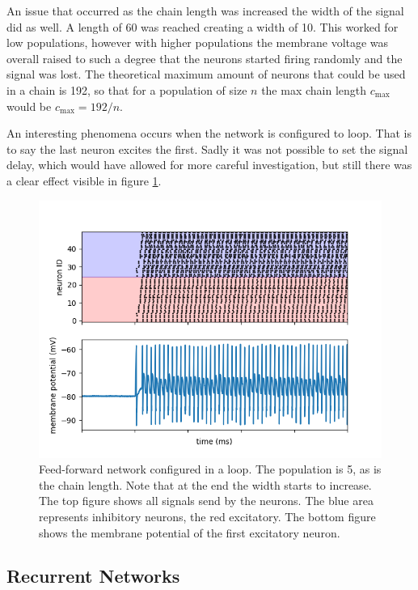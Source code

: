 \documentclass[a4paper,twocolumn]{article}
\begin{document}
An issue that occurred as the chain length was increased the width of the signal
did as well. A length of 60 was reached creating a width of 10. This worked for
low populations, however with higher populations the membrane voltage was
overall raised to such a degree that the neurons started firing randomly and the
signal was lost. The theoretical maximum amount of neurons that could be used in
a chain is 192, so that for a population of size $n$ the max chain length
$c_\text{max}$ would be $c_\text{max} = 192 / n$.

An interesting phenomena occurs when the network is configured to loop. That is
to say the last neuron excites the first. Sadly it was not possible to set the
signal delay, which would have allowed for more careful investigation, but still
there was a clear effect visible in figure \ref{fig:feed-forward-loop}.

\begin{figure}
    \centering
    \includegraphics[width=.5\textwidth]{figures/feedforward signals loop.png}
    \caption{Feed-forward network configured in a loop. The population is 5, as
        is the chain length. Note that at the end the width starts to increase.
        The top figure shows all signals send by the neurons. The blue area
        represents inhibitory neurons, the red excitatory. The bottom figure
        shows the membrane potential of the first excitatory neuron.}
    \label{fig:feed-forward-loop}
\end{figure}

\subsection{Recurrent Networks}
\end{document}
